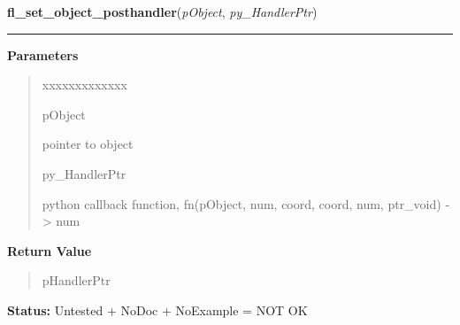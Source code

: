 \hspace{.8\funcindent}\begin{boxedminipage}{\funcwidth}

    \raggedright \textbf{fl\_set\_object\_posthandler}(\textit{pObject}, \textit{py\_HandlerPtr})

    \vspace{-1.5ex}

    \rule{\textwidth}{0.5\fboxrule}
\setlength{\parskip}{2ex}
\setlength{\parskip}{1ex}
      \textbf{Parameters}
      \vspace{-1ex}

      \begin{quote}
        \begin{Ventry}{xxxxxxxxxxxxx}

          \item[pObject]

          pointer to object

          \item[py\_HandlerPtr]

          python callback function, fn(pObject, num, coord, coord, num, 
          ptr\_void) -{\textgreater} num

        \end{Ventry}

      \end{quote}

      \textbf{Return Value}
    \vspace{-1ex}

      \begin{quote}
      pHandlerPtr

      \end{quote}

\textbf{Status:} Untested + NoDoc + NoExample = NOT OK



    \end{boxedminipage}

    \label{xformslib:library:fl_set_object_callback}

    \vspace{0.5ex}

